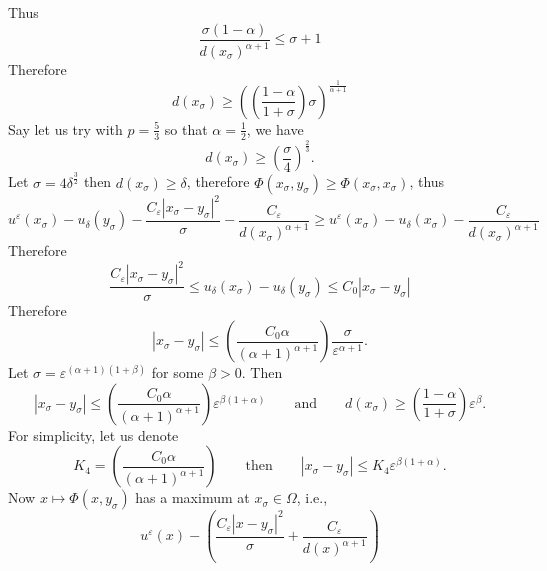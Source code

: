 \documentclass[11pt,reqno]{amsart}
\numberwithin{figure}{section}
\theoremstyle{plain}
\theoremstyle{remark}
\numberwithin{equation}{section}
\begin{document}
Thus
\begin{equation*}
    \frac{\sigma(1-\alpha)}{d(x_\sigma)^{\alpha+1}} \leq \sigma+1
\end{equation*}
Therefore
\begin{equation*}
    d(x_\sigma)\geq \left(\left(\frac{1-\alpha}{1+\sigma}\right)\sigma\right)^{\frac{1}{\alpha+1}} 
\end{equation*}
Say let us try with $p = \frac{5}{3}$ so that $\alpha = \frac{1}{2}$, we have
\begin{equation*}
    d(x_\sigma) \geq \left(\frac{\sigma}{4}\right)^\frac{2}{3}.
\end{equation*}
Let $\sigma = 4\delta^\frac{3}{2}$ then $d(x_\sigma)\geq \delta$, therefore $\Phi(x_\sigma,y_\sigma)\geq \Phi(x_\sigma,x_\sigma)$, thus
\begin{equation*}
      u^\varepsilon(x_\sigma) - u_\delta(y_\sigma) - \frac{C_\varepsilon |x_\sigma-y_\sigma|^2}{\sigma} - \frac{C_\varepsilon}{d(x_\sigma)^{\alpha+1}} \geq u^\varepsilon(x_\sigma) - u_\delta(x_\sigma) - \frac{C_\varepsilon}{d(x_\sigma)^{\alpha+1}}
\end{equation*}
Therefore
\begin{equation}\label{e:bdd_xi}
    \frac{C_\varepsilon|x_\sigma - y_\sigma|^2}{\sigma} \leq u_\delta(x_\sigma) - u_\delta(y_\sigma)\leq C_0|x_\sigma - y_\sigma|
\end{equation}
Therefore
\begin{equation*}
    |x_\sigma - y_\sigma|\leq \left(\frac{C_0\alpha}{(\alpha+1)^{\alpha+1}}\right)\frac{\sigma}{\varepsilon^{\alpha+1}}.
\end{equation*}
Let $\sigma = \varepsilon^{(\alpha+1)(1+\beta)}$ for some $\beta > 0$. Then
\begin{equation*}
    |x_\sigma - y_\sigma|\leq \left(\frac{C_0\alpha}{(\alpha+1)^{\alpha+1}}\right)\varepsilon^{\beta(1+\alpha)} \qquad\text{and}\qquad d(x_\sigma)\geq \left(\frac{1-\alpha}{1+\sigma}\right)\varepsilon^{\beta}.
\end{equation*}
For simplicity, let us denote
\begin{equation*}
    K_4 = \left(\frac{C_0\alpha}{(\alpha+1)^{\alpha+1}}\right) \qquad\text{then}\qquad |x_\sigma-y_\sigma|\leq K_4\varepsilon^{\beta(1+\alpha)}.
\end{equation*}
Now $x\mapsto \Phi(x,y_\sigma)$ has a maximum at $x_\sigma\in \Omega$, i.e.,
    \begin{equation*}
        u^\varepsilon(x) - \left(\frac{C_\varepsilon|x-y_\sigma|^2}{\sigma} + \frac{C_\varepsilon}{d(x)^{\alpha+1}}\right)
    \end{equation*}
\end{document}

